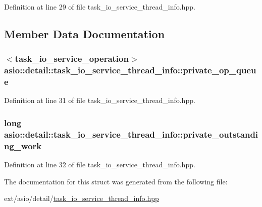 Definition at line 29 of file task\+\_\+io\+\_\+service\+\_\+thread\+\_\+info.\+hpp.



\subsection{Member Data Documentation}
\hypertarget{structasio_1_1detail_1_1task__io__service__thread__info_a997a840dcb5281af5be3aef23e750799}{}
\subsubsection[{private\+\_\+op\+\_\+queue}]{$<$task\+\_\+io\+\_\+service\+\_\+operation$>$ asio\+::detail\+::task\+\_\+io\+\_\+service\+\_\+thread\+\_\+info\+::private\+\_\+op\+\_\+queue}\label{structasio_1_1detail_1_1task__io__service__thread__info_a997a840dcb5281af5be3aef23e750799}


Definition at line 31 of file task\+\_\+io\+\_\+service\+\_\+thread\+\_\+info.\+hpp.

\hypertarget{structasio_1_1detail_1_1task__io__service__thread__info_a676e6bfbe7c7042cd3f556829e01cfdb}{}
\subsubsection[{private\+\_\+outstanding\+\_\+work}]{\setlength{\rightskip}{0pt plus 5cm}long asio\+::detail\+::task\+\_\+io\+\_\+service\+\_\+thread\+\_\+info\+::private\+\_\+outstanding\+\_\+work}\label{structasio_1_1detail_1_1task__io__service__thread__info_a676e6bfbe7c7042cd3f556829e01cfdb}


Definition at line 32 of file task\+\_\+io\+\_\+service\+\_\+thread\+\_\+info.\+hpp.



The documentation for this struct was generated from the following file\+:\begin{DoxyCompactItemize}
\item 
ext/asio/detail/\hyperlink{task__io__service__thread__info_8hpp}{task\+\_\+io\+\_\+service\+\_\+thread\+\_\+info.\+hpp}\end{DoxyCompactItemize}
